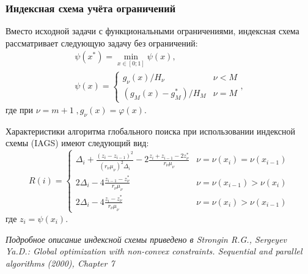 \documentclass[aspectratio=1610]{beamer}
\begin{document}
\begin{frame}
  \frametitle{Индексная схема учёта ограничений}
  Вместо исходной задачи с функциональными ограничениями, индексная схема рассматривает следующую задачу без ограничений:
  \begin{displaymath}
    \begin{array}{lr}
      \psi (x^{*})=\min_{x\in [0;1]}\psi (x), \\
      \psi (x)={\begin{cases}g_{\nu }(x)/H_{\nu }&\nu <M\\(g_{M}(x)-g_{M}^{*})/H_{M}&\nu =M\end{cases}},
    \end{array}
  \end{displaymath}
  где при \(\nu=m+1\;,g_\nu(x)=\varphi(x)\).

  Характеристики алгоритма глобального поиска при использовании индексной схемы (IAGS) имеют следующий вид:
  \begin{displaymath}
    R(i)={\begin{cases}\Delta _{i}+{\frac {(z_{i}-z_{i-1})^{2}}{(r_{\nu }\mu _{\nu })^{2}\Delta _{i}}}-2{\frac {z_{i}+z_{i-1}-2z_{\nu }^{*}}{r_{\nu }\mu _{\nu }}}&\nu =\nu (x_{i})=\nu (x_{i-1})\\2\Delta _{i}-4{\frac {z_{i-1}-z_{\nu }^{*}}{r_{\nu }\mu _{\nu }}}&\nu =\nu (x_{i-1})>\nu (x_{i})\\2\Delta _{i}-4{\frac {z_{i}-z_{\nu }^{*}}{r_{\nu }\mu _{\nu }}}&\nu =\nu (x_{i})>\nu (x_{i-1})\end{cases}}
  \end{displaymath}
  где \(z_i=\psi(x_i)\).

  \textit{\footnotesize	{Подробное описание индексной схемы приведено в Strongin R.G., Sergeyev Ya.D.: Global optimization with non-convex constraints. Sequential and parallel algorithms (2000), Chapter 7}}
\end{frame}
\end{document}
